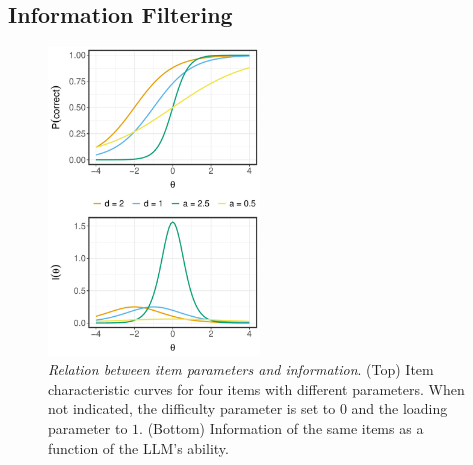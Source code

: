 \documentclass{article}
\begin{document}
\subsection{Information Filtering}
\begin{figure}[]
   \centering
   \includegraphics[width=0.5\textwidth]{figures/icc.pdf}
   \caption{\textit{Relation between item parameters and information}. (Top) Item characteristic curves for four items with different parameters. When not indicated, the difficulty parameter is set to $0$ and the loading parameter to $1$. (Bottom) Information of the same items as a function of the LLM's ability.}
   \label{fig:icc}
\end{figure}
\end{document}
